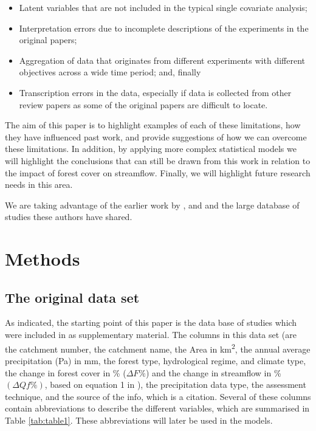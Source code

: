 \documentclass[]{elsarticle} %
\providecommand{\tightlist}{%
  \setlength{\itemsep}{0pt}\setlength{\parskip}{0pt}}
\begin{document}
\begin{itemize}
\tightlist
\item
  Latent variables that are not included in the typical single covariate analysis;
\item
  Interpretation errors due to incomplete descriptions of the experiments in the original papers;\\
\item
  Aggregation of data that originates from different experiments with different objectives across a wide time period; and, finally\\
\item
  Transcription errors in the data, especially if data is collected from other review papers as some of the original papers are difficult to locate.
\end{itemize}

The aim of this paper is to highlight examples of each of these limitations, how they have influenced past work, and provide suggestions of how we can overcome these limitations. In addition, by applying more complex statistical models we will highlight the conclusions that can still be drawn from this work in relation to the impact of forest cover on streamflow. Finally, we will highlight future research needs in this area.

We are taking advantage of the earlier work by \citet{zhang2017}, \citet{filoso2017} and \citet{zhou2015} and the large database of studies these authors have shared.

\hypertarget{methods}{%
\section{Methods}\label{methods}}

\hypertarget{the-original-data-set}{%
\subsection{The original data set}\label{the-original-data-set}}

As indicated, the starting point of this paper is the data base of studies which were included in \citet{zhang2017} as supplementary material. The columns in this data set (are the catchment number, the catchment name, the Area in km\textsuperscript{2}, the annual average precipitation (Pa) in mm, the forest type, hydrological regime, and climate type, the change in forest cover in \% (\(\Delta F\%\)) and the change in streamflow in \% \((\Delta Qf\%)\), based on equation 1 in \citet{zhang2017}), the precipitation data type, the assessment technique, and the source of the info, which is a citation.
Several of these columns contain abbreviations to describe the different variables, which are summarised in Table \ref{tab:table1}. These abbreviations will later be used in the models.
\end{document}
